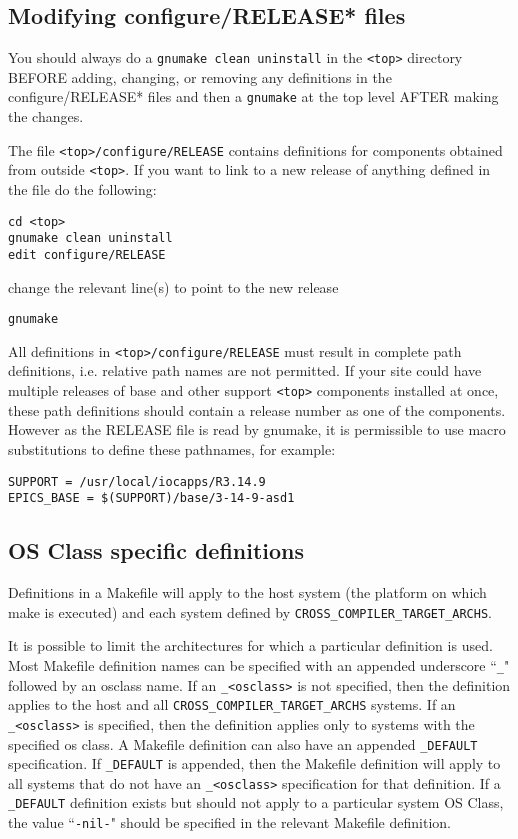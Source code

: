 \subsection{Modifying configure/RELEASE* files}

You should always do a \verb|gnumake clean uninstall| in the \verb|<top>| directory BEFORE adding, changing, or 
removing any definitions in the configure/RELEASE* files and then a \verb|gnumake| at the top level AFTER making the 
changes.

The file \verb|<top>/configure/RELEASE| contains definitions for components obtained from outside \verb|<top>|. If you want to link 
to a new release of anything defined in the file do the following:
\begin{verbatim}
cd <top>
gnumake clean uninstall
edit configure/RELEASE
\end{verbatim}
change the relevant line(s) to point to the new release
\begin{verbatim}
gnumake
\end{verbatim}
All definitions in \verb|<top>/configure/RELEASE| must result in complete path definitions, i.e. relative path names are not 
permitted. If your site could have multiple releases of base and other support \verb|<top>| components installed at once, these 
path definitions should contain a release number as one of the components. However as the RELEASE file is read by 
gnumake, it is permissible to use macro substitutions to define these pathnames, for example:
\begin{verbatim}
SUPPORT = /usr/local/iocapps/R3.14.9 
EPICS_BASE = $(SUPPORT)/base/3-14-9-asd1
\end{verbatim}

\subsection{OS Class specific definitions}

Definitions in a Makefile will apply to the host system (the platform on which make is executed) and each system defined 
by \verb|CROSS_COMPILER_TARGET_ARCHS|.

It is possible to limit the architectures for which a particular definition is used. Most Makefile definition names can be specified with 
an appended underscore ``\verb|_|" followed by an osclass name. If an \verb|_<osclass>| is not specified, then the definition 
applies to the host and all \verb|CROSS_COMPILER_TARGET_ARCHS| systems. If an \verb|_<osclass>| is specified, then the 
definition applies only to systems with the specified os class. A Makefile definition can also have an appended 
\verb|_DEFAULT| specification. If \verb|_DEFAULT| is appended, then the Makefile definition will apply to all systems that do not 
have an \verb|_<osclass>| specification for that definition. If a \verb|_DEFAULT| definition exists but should 
not apply to a particular system OS Class, the value ``\verb|-nil-|" should be specified in the relevant Makefile definition.

